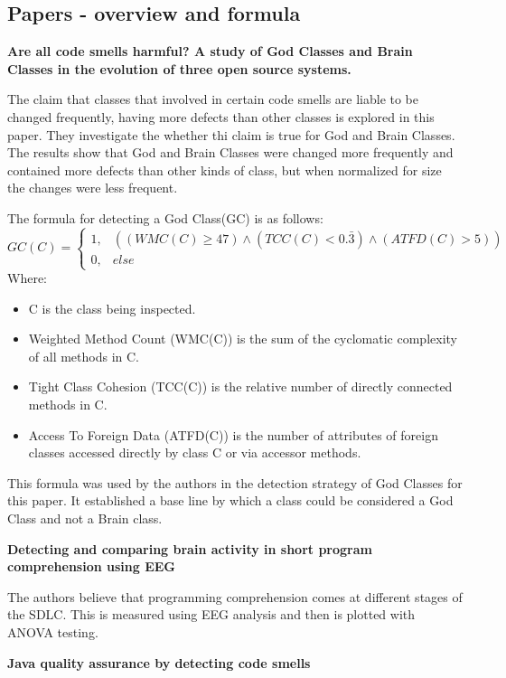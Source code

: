 \documentclass[a4paper]{article}
\begin{document}
\subsection{Papers - overview and formula}

\textbf{Are all code smells harmful? A study of God Classes and Brain Classes in the evolution of three open 
source systems.} 

\cite{olbrich_are_2010} The claim that classes that involved in certain code smells are liable to be changed 
frequently, having more defects than other classes is explored in this paper. They investigate the whether thi 
claim is true for God  and Brain Classes. The results show that God and Brain Classes were changed more 
frequently and contained more defects than other kinds of class, but when normalized for size the changes were 
less frequent.

The formula for detecting a God Class(GC) is as follows:
\[GC(C) = \begin{cases}
			1, & ((WMC(C) \geq 47) \wedge (TCC(C) < 0.\bar{3}) \wedge (ATFD(C) > 5)) \\
            0, & else
\end{cases}\]
Where: 
\begin{itemize}
\item C is the class being inspected.
\item Weighted Method Count (WMC(C)) is the sum of the cyclomatic complexity of all methods in C.
\item Tight Class Cohesion (TCC(C)) is the relative number of directly connected methods in C.
\item Access To Foreign Data (ATFD(C)) is the number of attributes of foreign classes accessed directly by class C or via accessor methods.
\end{itemize}

This formula was used by the authors in the detection strategy of God Classes for this paper. It established a base line by which a class could be considered a God Class and not a Brain class.


\textbf{Detecting and comparing brain activity in short program comprehension using EEG}

\cite{yeh_detecting_2017}The authors believe that programming comprehension comes at different stages of the SDLC. This is measured using EEG analysis and then is plotted with ANOVA testing.

\textbf{Java quality assurance by detecting code smells}
\end{document}

